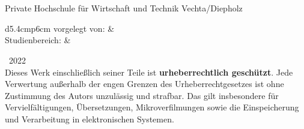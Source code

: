 \thispagestyle{plain}
\begin{titlepage}
    \begin{center}
        \vspace{0.8cm}
        \huge{\textbf{\art}}\\[1.5ex]
        
        \LARGE{\titel}\\[2ex]
        
        \large{Private Hochschule für Wirtschaft und Technik Vechta/Diepholz}
        
        \vspace{0.8cm}
        \normalsize
        \onehalfspacing
        \begin{tabular}{d{5.4cm}p{6cm}}
            vorgelegt von:  & \quad \autor          \\
            Studienbereich: & \quad \studienbereich \\
        \end{tabular}
    \end{center}
    
    \setcounter{tocdepth}{1} %
    \let\clearpage\relax\tableofcontents
    
    \centering
    \textcopyright\ 2022\\[1.5ex]
    
    \singlespacing
    \small
    \noindent Dieses Werk einschließlich seiner Teile ist \textbf{urheberrechtlich geschützt}. Jede Verwertung außerhalb der engen Grenzen des Urheberrechtgesetzes ist ohne Zustimmung des Autors unzulässig und strafbar. Das gilt insbesondere für Vervielfältigungen, Übersetzungen, Mikroverfilmungen sowie die Einspeicherung und Verarbeitung in elektronischen Systemen.
    
\end{titlepage}
